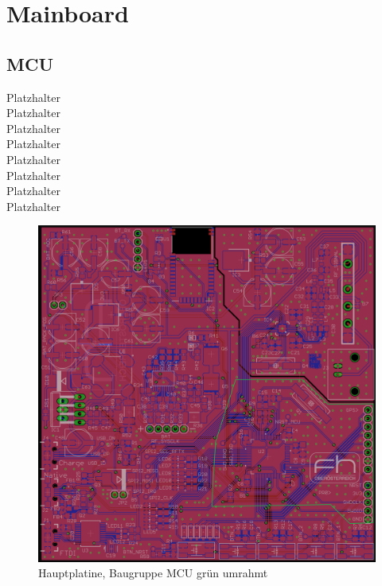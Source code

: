 \documentclass[a4paper]{scrartcl}
\begin{document}
\ofoot{\pagemark}

\tableofcontents
\newpage

\section{Mainboard}
\subsection{MCU}

Platzhalter\\Platzhalter\\Platzhalter\\Platzhalter\\Platzhalter\\Platzhalter\\
Platzhalter\\Platzhalter

\begin{figure}[H]\centering
\includegraphics[page=1, angle=0, width=\linewidth]{../Documentation/pics/mainboard_mcu.png}
\caption{Hauptplatine, Baugruppe MCU grün umrahmt}
\label{fig:abb1}
\end{figure}
\end{document}
